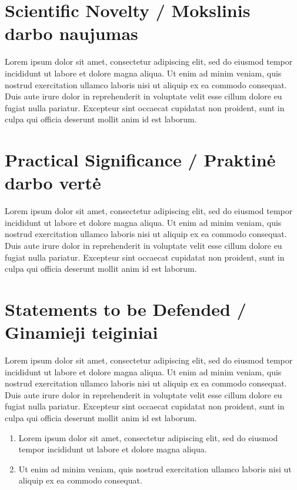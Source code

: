 \section*{Scientific Novelty / Mokslinis darbo naujumas} %

Lorem ipsum dolor sit amet, consectetur adipiscing elit, sed do eiusmod tempor incididunt ut labore et dolore magna aliqua. Ut enim ad minim veniam, quis nostrud exercitation ullamco laboris nisi ut aliquip ex ea commodo consequat. Duis aute irure dolor in reprehenderit in voluptate velit esse cillum dolore eu fugiat nulla pariatur. Excepteur sint occaecat cupidatat non proident, sunt in culpa qui officia deserunt mollit anim id est laborum.


\section*{Practical Significance / Praktinė darbo vertė}  %

Lorem ipsum dolor sit amet, consectetur adipiscing elit, sed do eiusmod tempor incididunt ut labore et dolore magna aliqua. Ut enim ad minim veniam, quis nostrud exercitation ullamco laboris nisi ut aliquip ex ea commodo consequat. Duis aute irure dolor in reprehenderit in voluptate velit esse cillum dolore eu fugiat nulla pariatur. Excepteur sint occaecat cupidatat non proident, sunt in culpa qui officia deserunt mollit anim id est laborum.


\section*{Statements to be Defended / Ginamieji teiginiai}

Lorem ipsum dolor sit amet, consectetur adipiscing elit, sed do eiusmod tempor incididunt ut labore et dolore magna aliqua. Ut enim ad minim veniam, quis nostrud exercitation ullamco laboris nisi ut aliquip ex ea commodo consequat. Duis aute irure dolor in reprehenderit in voluptate velit esse cillum dolore eu fugiat nulla pariatur. Excepteur sint occaecat cupidatat non proident, sunt in culpa qui officia deserunt mollit anim id est laborum.

\begin{enumerate}
    \item Lorem ipsum dolor sit amet, consectetur adipiscing elit, sed do eiusmod tempor incididunt ut labore et dolore magna aliqua. 
    \item  Ut enim ad minim veniam, quis nostrud exercitation ullamco laboris nisi ut aliquip ex ea commodo consequat.
\end{enumerate}

